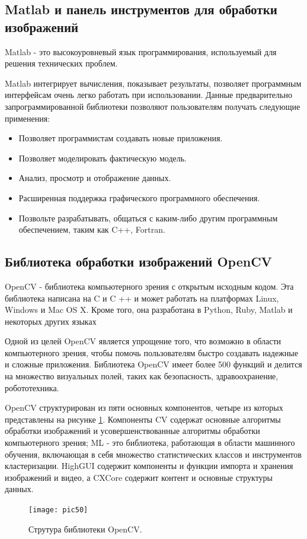 \documentclass[a4paper,14pt]{extreport}
\begin{document}
\subsection{Matlab и панель инструментов для обработки изображений}
Matlab - это высокоуровневый язык программирования, используемый для решения технических проблем. 

Matlab интегрирует вычисления, показывает результаты, позволяет программным интерфейсам очень легко  работать при использовании. Данные предварительно запрограммированной библиотеки позволяют пользователям получать следующие применения:

\begin{itemize}
	\item Позволяет программистам создавать новые приложения.
 \item Позволяет моделировать фактическую модель.
\item Анализ, просмотр и отображение данных.
\item Расширенная поддержка графического программного обеспечения.
\item Позвольте разрабатывать, общаться с каким-либо другим программным обеспечением, таким как C++, Fortran.

\end{itemize}

\subsection{Библиотека обработки изображений OpenCV}
OpenCV \cite{h149} - библиотека компьютерного  зрения с открытым исходным кодом. Эта библиотека написана на C и C ++ и может работать на платформах Linux, Windows и Mac OS X. Кроме того, она разработана в Python, Ruby, Matlab и некоторых других языках

Одной из целей OpenCV является упрощение того, что возможно в области компьютерного зрения, чтобы помочь пользователям быстро создавать надежные и сложные приложения. Библиотека OpenCV имеет более 500 функций и делится на множество визуальных полей, таких как безопасность, здравоохранение, робототехника.

OpenCV структурирован из пяти основных компонентов, четыре из которых представлены на рисунке \ref{pic50}. Компоненты CV содержат основные алгоритмы обработки изображений и усовершенствованные алгоритмы обработки компьютерного зрения; ML - это библиотека, работающая в области машинного обучения, включающая в себя множество статистических классов и инструментов кластеризации. HighGUI содержит компоненты и функции импорта и хранения изображений и видео, а CXCore содержит контент и основные структуры данных.
\begin{figure}[ht!]
\centering
\texttt{[image: pic50]}
\caption{Струтура библиотеки OpenCV.}
	\label{pic50}
		\end{figure}
\end{document}
